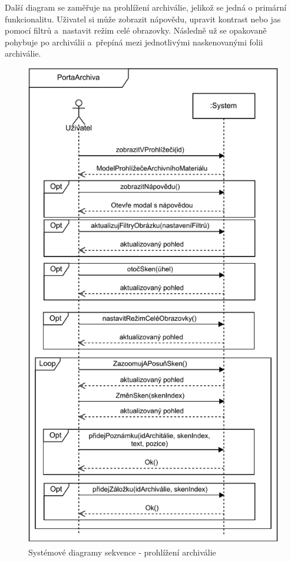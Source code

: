 \newpage
\noindent Další diagram se zaměřuje na prohlížení archiválie, jelikož se jedná o primární funkcionalitu. Uživatel si může zobrazit nápovědu, upravit kontrast nebo jas pomocí filtrů a~nastavit režim celé obrazovky. Následně už se opakovaně pohybuje po archiválii a~přepíná mezi jednotlivými naskenovanými folii archiválie.

\begin{figure}[htbp]
\centering
    \includegraphics[scale=.85]{obrazky-figures/specification/SSD_preview_scans.pdf}
    \caption{Systémové diagramy sekvence - prohlížení archiválie}
\end{figure}

